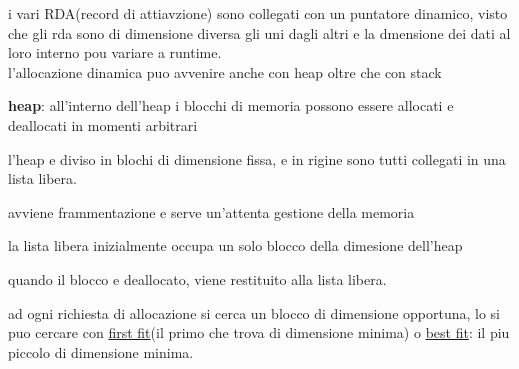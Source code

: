 \documentclass[12pt]{article}
\begin{document}
i vari RDA(record di attiavzione) sono collegati con un puntatore dinamico, visto che gli rda sono di dimensione diversa gli uni dagli altri e la dmensione dei dati al loro interno pou variare a runtime.\\

l'allocazione dinamica puo avvenire anche con heap oltre che con stack

\textbf{heap}: all'interno dell'heap i blocchi di memoria possono essere allocati e deallocati in momenti arbitrari

l'heap e diviso in blochi di dimensione fissa, e in rigine sono tutti collegati in una lista libera.

avviene frammentazione  e serve un'attenta gestione della memoria

la lista libera inizialmente occupa un solo blocco della dimesione dell'heap

quando il blocco e deallocato, viene restituito alla lista libera.

ad ogni richiesta di allocazione si cerca un blocco di dimensione opportuna, lo si puo cercare con \underline{first fit}(il primo che trova di dimensione minima) o \underline{best fit}: il piu piccolo di dimensione minima.
\end{document}
